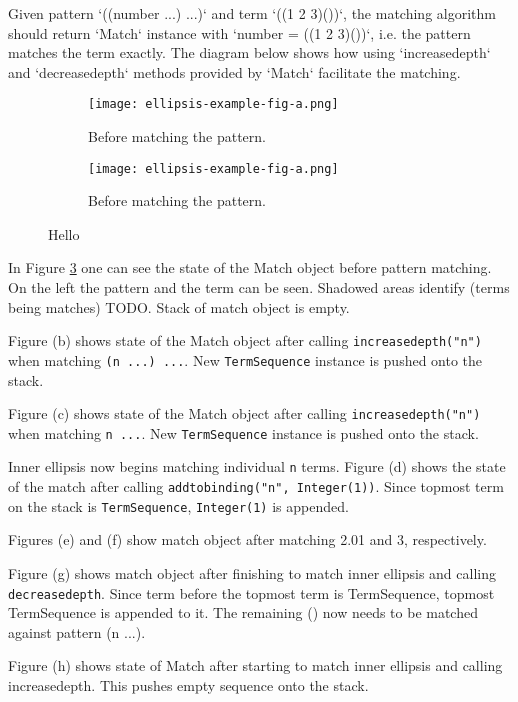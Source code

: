 Given pattern `((number ...) ...)` and term `((1 2 3)())`, the matching algorithm should return `Match` instance with `number = ((1 2 3)())`, i.e. the pattern matches the term exactly. The diagram below shows how using `increasedepth` and `decreasedepth` methods provided by `Match` facilitate the matching. 

\begin{figure}[H]
\begin{subfigure}{1.0\linewidth}
	\texttt{[image: ellipsis-example-fig-a.png]}
	\caption{Before matching the pattern.}
	\label{ellipsis-example-fig-a}
\end{subfigure}
\begin{subfigure}{1.0\linewidth}
	\texttt{[image: ellipsis-example-fig-a.png]}
	\caption{Before matching the pattern.}
	\label{ellipsis-example-fig-a}
\end{subfigure}

\caption{Hello}
\end{figure}
In Figure \ref{ellipsis-example-fig-a} one can see the state of the Match object before pattern matching. On the left the pattern and the term can be seen. Shadowed areas identify (terms being matches) TODO.  Stack of match object is empty.

Figure (b) shows state of the Match object after calling \texttt{increasedepth("n")} when matching \texttt{(n ...) ...}. New \texttt{TermSequence} instance is pushed onto the stack.

Figure (c) shows state of the Match object after calling \texttt{increasedepth("n")} when matching \texttt{n ...}. New \texttt{TermSequence} instance is pushed onto the stack.

Inner ellipsis now begins matching individual \texttt{n} terms. Figure (d) shows the state of the match after calling \texttt{addtobinding("n", Integer(1))}. Since topmost term on the stack is \texttt{TermSequence}, \texttt{Integer(1)} is appended.

Figures (e) and (f) show match object after matching 2.01 and 3, respectively.

Figure (g) shows match object after finishing to match inner ellipsis and calling \texttt{decreasedepth}. Since term before the topmost term is TermSequence, topmost TermSequence is appended to it. The remaining () now needs to be matched against pattern (n ...).

Figure (h) shows state of Match after starting to match inner ellipsis and calling increasedepth. This pushes empty sequence onto the stack.

